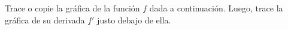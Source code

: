 \item Trace o copie la gráfica de la función $f$ dada a continuación. Luego, trace la gráfica de su derivada $f'$ justo debajo de ella.
\begin{center}
\end{center}
